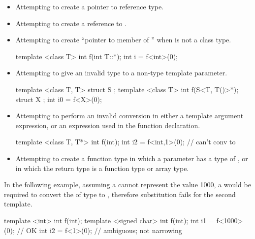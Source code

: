 \begin{note}
\begin{itemize}
\begin{example}
\begin{codeblock}
int main() {
  // Deduction fails in each of these cases:
  f<A>(0);          //  does not contain a member 
  f<B>(0);          // The  member of  is not a type
  g<C>(0);          // The  member of  is not a non-type
  h<D>(0);          // The  member of  is not a template
}
\end{codeblock}
\end{example}
\item
Attempting to create a pointer to reference type.
\item
Attempting to create a reference to .
\item
Attempting to create ``pointer to member of '' when  is not a
class type.
\begin{example}
\begin{codeblock}
template <class T> int f(int T::*);
int i = f<int>(0);
\end{codeblock}
\end{example}
\item
Attempting to give an invalid type to a non-type template parameter.
\begin{example}
\begin{codeblock}
template <class T, T> struct S {};
template <class T> int f(S<T, T()>*);
struct X {};
int i0 = f<X>(0);
\end{codeblock}
\end{example}

\item
Attempting to perform an invalid conversion in either a template
argument expression, or an expression used in the function
declaration.
\begin{example}
\begin{codeblock}
template <class T, T*> int f(int);
int i2 = f<int,1>(0);           // can't conv  to 
\end{codeblock}
\end{example}

\item
Attempting to create a function type in which a parameter has a type
of , or in which the return type is a function type
or array type.
\end{itemize}
\end{note}

\pnum
\begin{example}
In the following example,
assuming a 
cannot represent the value 1000,
a 
would be required
to convert the 
of type  to ,
therefore substitution fails for the
second template.

\begin{codeblock}
template <int> int f(int);
template <signed char> int f(int);
int i1 = f<1000>(0);            // OK
int i2 = f<1>(0);               // ambiguous; not narrowing
\end{codeblock}
\end{example}

